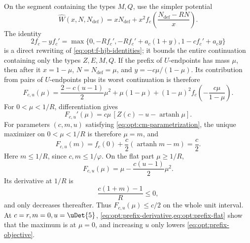 On the segment containing the types $M,Q$, use the simpler potential
\[
 \widehat W(x,N,N_{\mathrm{def}})=xN_{\mathrm{def}}+x^2f_c\!\left(\frac{N_{\mathrm{def}}-RN}{x}\right).
\]
The identity
\begin{equation}
 2f_c-yf_c'
 =\max\{0,-Rf_c',-Rf_c'+a_c(1+y),
              1-cf_c'+a_cy\}
 \label{eq:opt:ordinary-HJB}
\end{equation}
is a direct rewriting of \eqref{eq:opt:f-hjb-identities}; it bounds the
entire continuation containing only the types $Z,E,M,Q$.  If the prefix of
$U$-endpoints has mass $\mu$, then
after it $x=1-\mu$, $N=N_{\mathrm{def}}=\mu$, and
$y=-c\mu/(1-\mu)$.  Its contribution from pairs of $U$-endpoints plus its worst
continuation is therefore
\begin{equation}
 F_{c,u}(\mu)
 =\frac{2-c(u-1)}2\mu^2+\mu(1-\mu)
 +(1-\mu)^2f_c\!\left(-\frac{c\mu}{1-\mu}\right).
 \label{eq:opt:prefix-objective}
\end{equation}
For $0<\mu<1/R$, differentiation gives
\begin{equation}
 F_{c,u}'(\mu)
 =c\mu\,[Z(c)-u-\operatorname{artanh}\mu].
 \label{eq:opt:prefix-derivative}
\end{equation}
For parameters $(c,m,u)$ satisfying
\cref{eq:opt:cm-parametrization}, the unique maximizer on
$0<\mu<1/R$ is therefore $\mu=m$, and
\begin{equation}
 F_{c,u}(m)
 =f_c(0)+\frac c2(\operatorname{artanh}m-m)=\frac c2.
 \label{eq:opt:prefix-maximum}
\end{equation}
Here $m\le1/R$, since $c,m\le1/\varphi$.  On the flat part
$\mu\ge1/R$,
\begin{equation}
 F_{c,u}(\mu)=\mu-\frac{c(u-1)}2\mu^2.
 \label{eq:opt:prefix-flat}
\end{equation}
Its derivative at $1/R$ is
\[
 \frac{c(1+m)-1}{R}\le0,
\]
and only decreases thereafter.  Thus $F_{c,u}(\mu)\le c/2$ on the whole
unit interval.  At $c=r,m=0,u=\uDet{5}$,
\cref{eq:opt:prefix-derivative,eq:opt:prefix-flat} show that the maximum is
at $\mu=0$, and increasing $u$ only lowers
\eqref{eq:opt:prefix-objective}.

